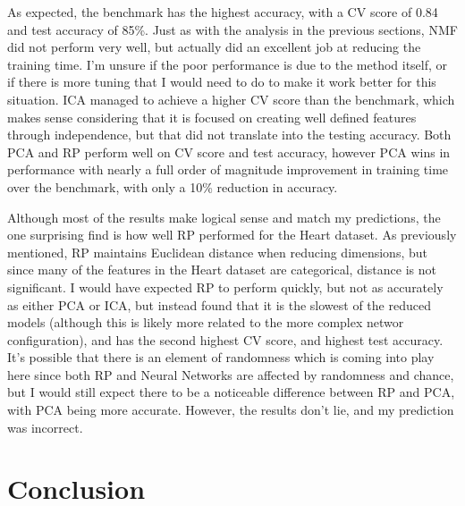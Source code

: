 \documentclass[
	letterpaper, %
]{mlreport}
\begin{document}
As expected, the benchmark has the highest accuracy, with a CV score of 0.84 and test accuracy of 85\%. Just as with the analysis in the previous sections, NMF did not perform very well, but actually did an excellent job at reducing the training time. I'm unsure if the poor performance is due to the method itself, or if there is more tuning that I would need to do to make it work better for this situation. ICA managed to achieve a higher CV score than the benchmark, which makes sense considering that it is focused on creating well defined features through independence, but that did not translate into the testing accuracy. Both PCA and RP perform well on CV score and test accuracy, however PCA wins in performance with nearly a full order of magnitude improvement in training time over the benchmark, with only a 10\% reduction in accuracy.

Although most of the results make logical sense and match my predictions, the one surprising find is how well RP performed for the Heart dataset. As previously mentioned, RP maintains Euclidean distance when reducing dimensions, but since many of the features in the Heart dataset are categorical, distance is not significant. I would have expected RP to perform quickly, but not as accurately as either PCA or ICA, but instead found that it is the slowest of the reduced models (although this is likely more related to the more complex networ configuration), and has the second highest CV score, and highest test accuracy. It's possible that there is an element of randomness which is coming into play here since both RP and Neural Networks are affected by randomness and chance, but I would still expect there to be a noticeable difference between RP and PCA, with PCA being more accurate. However, the results don't lie, and my prediction was incorrect.

\section{Conclusion}

\nocite{Mitchell}
\printbibliography
\end{document}
